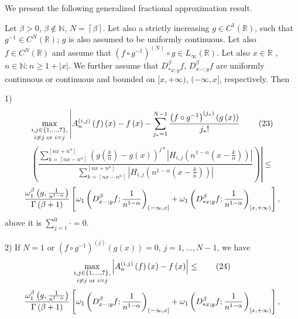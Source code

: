 \documentclass[10pt]{NSP1}
\numberwithin{equation}{section}
\begin{document}
We present the following generalized fractional approximation result.

\begin{theorem}
\label{t11} Let $\beta >0$, $\beta \notin \mathbb{N}$, $N=\left \lceil \beta
\right \rceil $. Let also a strictly increasing $g\in C^{1}\left( \mathbb{R}%
\right) $, such that $g^{-1}\in C^{N}\left( \mathbb{R}\right) $; $g$ is also
assumed to be uniformly continuous. Let also $f\in C^{N}\left( \mathbb{R}%
\right) $ and assume that $\left( f\circ g^{-1}\right) ^{\left( N\right)
}\circ g\in L_{\infty }\left( \mathbb{R}\right) $. Let also $x\in \mathbb{R}$%
, $n\in \mathbb{N}:n\geq 1+\left \vert x\right \vert $. We further assume
that $D_{\ast x;g}^{\beta }f$, $D_{x-;g}^{\beta }f$ are uniformly continuous
or continuous and bounded on $[x,+\infty )$, $(-\infty ,x]$, respectively.
Then

1)
\begin{equation}
\underset{i\neq j\text{ or }i=j}{\underset{i,j\in \left \{ 1,...,7\right \} ,%
}{\max }}\left \vert A_{n}^{\left( i,j\right) }\left( f\right) \left(
x\right) -f\left( x\right) -\sum_{j_{\ast }=1}^{N-1}\frac{\left( f\circ
g^{-1}\right) ^{\left( j_{\ast }\right) }\left( g\left( x\right) \right) }{%
j_{\ast }!}\right.  \tag{23}  \label{23}
\end{equation}
\begin{equation*}
\left. \left( \frac{\sum \limits_{k=\left \lceil nx-n^{\alpha }\right \rceil
}^{\left[ nx+n^{\alpha }\right] }\left( g\left( \frac{k}{n}\right) -g\left(
x\right) \right) ^{j\ast }\left \vert H_{i,j}\left( n^{1-\alpha }\left( x-%
\frac{k}{n}\right) \right) \right \vert }{\sum \limits_{k=\left \lceil
nx-n^{\alpha }\right \rceil }^{\left[ nx+n^{\alpha }\right] }\left \vert
H_{i,j}\left( n^{1-\alpha }\left( x-\frac{k}{n}\right) \right) \right \vert }%
\right) \right \vert \leq
\end{equation*}
\begin{equation*}
\frac{\omega _{1}^{\beta }\left( g,\frac{1}{n^{1-\alpha }}\right) }{\Gamma
\left( \beta +1\right) }\left[ \omega _{1}\left( D_{x-;g}^{\beta }f;\frac{1}{%
n^{1-\alpha }}\right) _{(-\infty ,x]}+\omega _{1}\left( D_{\ast x;g}^{\beta
}f;\frac{1}{n^{1-\alpha }}\right) _{[x,+\infty )}\right] ,
\end{equation*}
above it is $\sum_{j=1}^{0}\cdot =0.$

2) If $N=1$ or $\left( f\circ g^{-1}\right) ^{\left( j\right) }\left(
g\left( x\right) \right) =0$, $j=1,...,N-1$, we have
\begin{equation}
\underset{i\neq j\text{ or }i=j}{\underset{i,j\in \left\{ 1,...,7\right\} ,}{%
\max }}\left\vert A_{n}^{\left( i,j\right) }\left( f\right) \left( x\right)
-f\left( x\right) \right\vert \leq   \tag{24}  \label{24}
\end{equation}
\begin{equation*}
\frac{\omega _{1}^{\beta }\left( g,\frac{1}{n^{1-\alpha }}\right) }{\Gamma
\left( \beta +1\right) }\left[ \omega _{1}\left( D_{x-;g}^{\beta }f;\frac{1}{%
n^{1-\alpha }}\right) _{(-\infty ,x]}+\omega _{1}\left( D_{\ast x;g}^{\beta
}f;\frac{1}{n^{1-\alpha }}\right) _{[x,+\infty )}\right] ,
\end{equation*}


\end{theorem}
\end{document}

